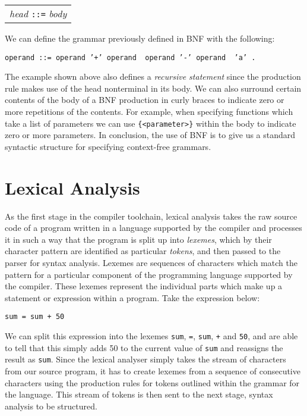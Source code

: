 \documentclass[a4paper, 11pt]{article}
\begin{document}
\begin{center}
	\begin{tabular}{l}
		\textit{head} \texttt{::=} \textit{body}
	\end{tabular}
\end{center}

\noindent We can define the grammar previously defined in BNF with the following:

\begin{center}
	\texttt{operand ::= operand '+' operand \textbar\ operand '-' operand \textbar\ 'a' .}
\end{center}

\noindent The example shown above also defines a \textit{recursive statement} since the production rule makes use of the head nonterminal in its body. We can also surround certain contents of the body of a BNF production in curly braces to indicate zero or more repetitions of the contents. For example, when specifying functions which take a list of parameters we can use \texttt{\{<parameter>\}} within the body to indicate zero or more parameters. In conclusion, the use of BNF is to give us a standard syntactic structure for specifying context-free grammars.


\clearpage
\section{Lexical Analysis}
As the first stage in the compiler toolchain, lexical analysis takes the raw source code of a program written in a language supported by the compiler and processes it in such a way that the program is split up into \textit{lexemes}, which by their character pattern are identified as particular \textit{tokens}, and then passed to the parser for syntax analysis. Lexemes are sequences of characters which match the pattern for a particular component of the programming language supported by the compiler. These lexemes represent the individual parts which make up a statement or expression within a program. Take the expression below:

\begin{center}
	\texttt{sum = sum + 50}
\end{center}

\noindent We can split this expression into the lexemes \texttt{sum}, \texttt{=}, \texttt{sum}, \texttt{+} and \texttt{50}, and are able to tell that this simply adds 50 to the current value of \texttt{sum} and reassigns the result as \texttt{sum}. Since the lexical analyser simply takes the stream of characters from our source program, it has to create lexemes from a sequence of consecutive characters using the production rules for tokens outlined within the grammar for the language. This stream of tokens is then sent to the next stage, syntax analysis to be structured.
\end{document}
